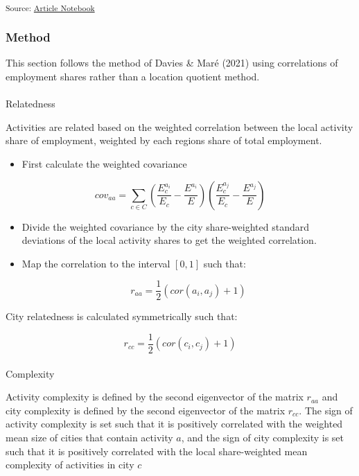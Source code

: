 \documentclass[
]{agujournal2019}
\makeatletter
\let\oldparagraph\paragraph
\renewcommand{\paragraph}{
    \@ifstar
      \xxxParagraphStar
      \xxxParagraphNoStar
  }
\newcommand{\xxxParagraphStar}[1]{\oldparagraph*{#1}\mbox{}}
\newcommand{\xxxParagraphNoStar}[1]{\oldparagraph{#1}\mbox{}}
\providecommand{\tightlist}{%
  \setlength{\itemsep}{0pt}\setlength{\parskip}{0pt}}\usepackage{longtable,booktabs,array}
\makeatother
\begin{document}
\textsubscript{Source:
\href{https://aiti-flinders.github.io/sirp-complexity/index.qmd.html}{Article
Notebook}}

\subsubsection{Method}\label{method}

This section follows the method of Davies \& Maré (2021) using
correlations of employment shares rather than a location quotient
method.

\paragraph{Relatedness}\label{relatedness}

Activities are related based on the weighted correlation between the
local activity share of employment, weighted by each regions share of
total employment.

\begin{itemize}
\tightlist
\item
  First calculate the weighted covariance
\end{itemize}

\[
cov_{aa} = \sum_{c \in C} (\frac{E_c^{a_i}}{E_c}-\frac{E^{a_i}}{E})(\frac{E_c^{a_j}}{E_c}-\frac{E^{a_j}}{E})
\]

\begin{itemize}
\item
  Divide the weighted covariance by the city share-weighted standard
  deviations of the local activity shares to get the weighted
  correlation.
\item
  Map the correlation to the interval \([0,1]\) such that:

  \[
  r_{aa} = \frac{1}{2}(cor(a_i, a_j) + 1)
  \]
\end{itemize}

City relatedness is calculated symmetrically such that:

\[
r_{cc} = \frac{1}{2}(cor(c_i, c_j) + 1)
\]

\paragraph{Complexity}\label{complexity}

Activity complexity is defined by the second eigenvector of the matrix
\(r_{aa}\) and city complexity is defined by the second eigenvector of
the matrix \(r_{cc}\). The sign of activity complexity is set such that
it is positively correlated with the weighted mean size of cities that
contain activity \(a\), and the sign of city complexity is set such that
it is positively correlated with the local share-weighted mean
complexity of activities in city \(c\)
\end{document}
